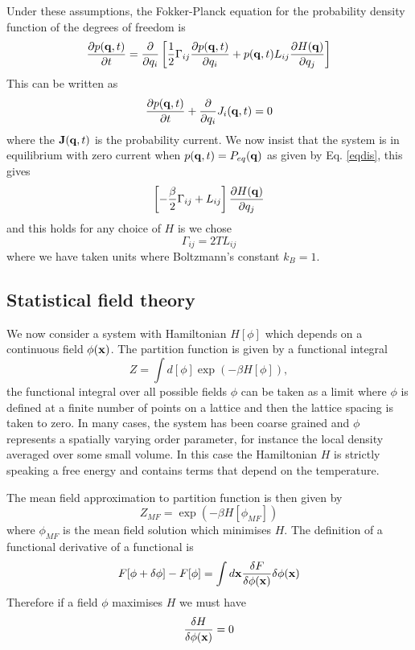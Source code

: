 Under these assumptions, the Fokker-Planck equation for the probability density function of the degrees of freedom is 
\begin{equation}
    \frac{\partial p({\bf q},t)}{\partial t} =  \frac{\partial}{\partial q_i} \left[\frac{1}{2}\Gamma_{ij} \frac{\partial p({\bf q},t)}{\partial q_i} + p({\bf q},t) L_{ij}\frac{\partial H({\bf q})}{ \partial q_j}\right]
\end{equation}
This can be written as 
\begin{equation}
    \frac{\partial p({\bf q},t)}{\partial t} +\frac{\partial}{\partial q_i}J_i({\bf q},t)=0
\end{equation}
where the ${\bf J}({\bf q},t)$ is the probability current. We now insist that the system is in equilibrium with zero current when $p({\bf q},t)= P_{eq}({\bf q})$ as given by Eq. \eqref{eqdis}, this gives
\begin{equation}
    \left[-\frac{\beta}{2}\Gamma_{ij} + L_{ij}\right]\frac{\partial H({\bf q})}{ \partial q_j}
\end{equation}
and this holds for any choice of $H$ is we chose
\begin{equation}
    \Gamma_{ij}= 2T L_{ij}
\end{equation}
where we have taken units where Boltzmann's constant $k_B=1$. 

    \subsection{Statistical field theory}

We now consider a system with Hamiltonian $H[\phi]$ which depends on a continuous field  $\phi({\bf x})$. The partition function is given by a functional integral
\begin{equation}
    Z = \int d[\phi] \exp(-\beta H[\phi]),
\end{equation}
the functional integral over all possible fields $\phi$ can be taken as a limit where $\phi$ is defined at a finite number of points on a lattice and then the lattice spacing is taken to zero. 
In many cases, the system has been coarse grained and $\phi$ represents a spatially varying order parameter, for instance the local density averaged over some small volume. In this case the Hamiltonian $H$ is strictly speaking a free energy  and contains terms that depend on the temperature.

The mean field approximation to partition function is then given by
\begin{equation}
    Z _{MF}=  \exp(-\beta H[\phi_{MF}])
\end{equation} 
where $\phi_{MF}$ is the mean field solution which minimises $H$. The definition of a functional derivative of a functional is
\begin{equation}
    F[\phi+\delta\phi]-F[\phi]= \int d{\bf x} \frac{\delta F}{\delta\phi({\bf x})} \delta\phi({\bf x})
\end{equation}
Therefore if a field $\phi$ maximises $H$ we must have 
\begin{equation}
    \frac{\delta H}{\delta\phi({\bf x})}=0
\end{equation}

